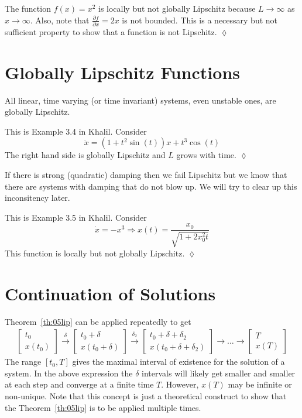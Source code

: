 \begin{example}
The function $f(x) = x^2$ is locally but not globally Lipschitz because $L\to\infty$ as $x\to\infty$. Also, note that $\frac{\partial f}{\partial x} = 2x$ is not bounded. This is a necessary but not sufficient property to show that a function is not Lipschitz.
$\lozenge$
\end{example}

\section{Globally Lipschitz Functions}
All linear, time varying (or time invariant) systems, even unstable ones, are globally Lipschitz.

\begin{example}
This is Example 3.4 in Khalil. Consider
$$\dot{x} = (1+t^2\sin(t))x + t^3\cos(t)$$
The right hand side is globally Lipschitz and $L$ grows with time.
$\lozenge$
\end{example}

If there is strong (quadratic) damping then we fail Lipschitz but we know that there are systems with damping that do not blow up. We will try to clear up this inconsitency later.

\begin{example}
This is Example 3.5 in Khalil. Consider
$$\dot{x} = -x^3 \Rightarrow x(t) = \frac{x_0}{\sqrt{1+2x_0^2t}}$$
This function is locally but not globally Lipschitz.
$\lozenge$
\end{example}

\section{Continuation of Solutions}
Theorem~\ref{th:05lip} can be applied repeatedly to get
\begin{align*}
\left[\begin{array}{c} t_0 \\ x(t_0) \end{array}\right] \xrightarrow{\delta}
\left[\begin{array}{c} t_0+\delta \\ x(t_0+\delta) \end{array}\right] \xrightarrow{\delta_2}
\left[\begin{array}{c} t_0+\delta+\delta_2 \\ x(t_0+\delta+\delta_2) \end{array}\right] \rightarrow{}
\ldots \rightarrow{}
\left[\begin{array}{c} T \\ x(T) \end{array}\right]
\end{align*}
The range $[t_0, T]$ gives the maximal interval of existence for the solution of a system. In the above expression the $\delta$ intervals will likely get smaller and smaller at each step and converge at a finite time $T$. However, $x(T)$ may be infinite or non-unique. Note that this concept is just a theoretical construct to show that the Theorem~\ref{th:05lip} is to be applied multiple times.

